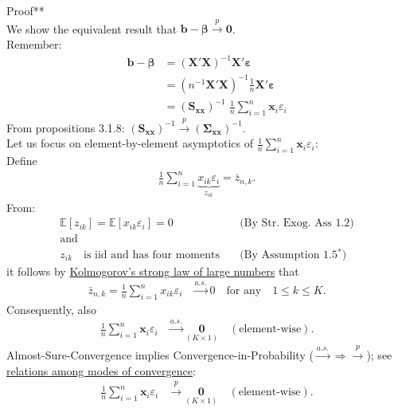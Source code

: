 \documentclass[
]{book}
\begin{document}
Proof**\\
We show the equivalent result that
\(\mathbf{b}-\boldsymbol{\beta}\overset{p}\longrightarrow \mathbf{0}\).\\
Remember:
\begin{align*}
\mathbf{b}-\boldsymbol{\beta}
&=(\mathbf{X}'\mathbf{X})^{-1}\mathbf{X}'\boldsymbol{\varepsilon}\\
&=(n^{-1}\mathbf{X}'\mathbf{X})^{-1}\frac{1}{n}\mathbf{X}'\boldsymbol{\varepsilon}\\
&=\left(\mathbf{S}_{\mathbf{x}\mathbf{x}}\right)^{-1}\;\frac{1}{n}\sum_{i=1}^n\mathbf{x}_i\varepsilon_i
\end{align*}
From propositions 3.1.8: \(\left(\mathbf{S}_{\mathbf{x}\mathbf{x}}\right)^{-1}\overset{p}\longrightarrow\left(\boldsymbol{\Sigma}_{\mathbf{x}\mathbf{x}}\right)^{-1}\).\\
Let us focus on element-by-element asymptotics of
\(\frac{1}{n}\sum_{i=1}^n\mathbf{x}_i\varepsilon_i\):\\
Define
\begin{align*}
\frac{1}{n}\sum_{i=1}^n\underbrace{x_{ik}\varepsilon_i}_{z_{ik}}=\bar{z}_{n,k}.
\end{align*}
From:
\[\begin{array}{ll}
\mathbb{E}[z_{ik}]=\mathbb{E}[x_{ik}\varepsilon_i]=0&\quad\text{(By Str. Exog. Ass 1.2)}\\
\text{and}&\\
z_{ik}\quad\text{is iid and has four moments}      &\quad\text{(By Assumption 1.5$^\ast$)}
\end{array}\]
it follows by \href{https://www.statlect.com/asymptotic-theory/law-of-large-numbers}{Kolmogorov's strong law of large numbers}
that
\begin{align*}
\bar{z}_{n,k}=\frac{1}{n}\sum_{i=1}^nx_{ik}\varepsilon_i&\overset{a.s.}\longrightarrow 0\quad\text{for any}\quad 1\leq k\leq K.
\end{align*}
Consequently, also
\begin{align*}
\frac{1}{n}\sum_{i=1}^n\mathbf{x}_i\varepsilon_i&\overset{a.s.}\longrightarrow\underset{(K\times 1)}{\mathbf{0}}
\quad(\text{element-wise}).
\end{align*}
Almost-Sure-Convergence
implies Convergence-in-Probability (\(\overset{a.s.}\longrightarrow \Rightarrow\overset{p}\longrightarrow\)); see \href{https://www.statlect.com/asymptotic-theory/relations-among-modes-of-convergence}{relations among modes of convergence}:
\begin{align*}
\frac{1}{n}\sum_{i=1}^n\mathbf{x}_i\varepsilon_i&\overset{p}\longrightarrow\underset{(K\times 1)}{\mathbf{0}}
\quad(\text{element-wise}).
\end{align*}
\end{document}
